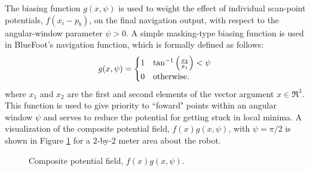 			The biasing function $g(x,\psi)$ is used to weight the effect of individual scan-point potentials, $f(x_{i}-p_{b})$, on the final navigation output, with respect to the angular-window parameter $\psi>0$. A simple masking-type biasing function is used in BlueFoot's navigation function, which is formally defined as follows:
				\begin{equation}
					g(x,\psi) = 
					\begin{cases}
					1	& \tan^{-1}\left( \frac{x_{2}}{x_{1}} \right) < \psi \\
					0 	& \text{otherwise}.
					\end{cases}
				\end{equation}
			where $x_{1}$ and $x_{2}$ are the first and second elements of the vector argument $x\in\Re^{3}$. This function is used to give priority to ``foward" points within an angular window $\psi$ and serves to reduce the potential for getting stuck in local minima. A visualization of  the composite potential field, $f(x)g(x,\psi)$, with $\psi=\pi/2$ is shown in Figure \ref{fig::potential_field} for a $2$-by-$2$ meter area about the robot.
				\begin{figure}[t!]
					\centering
					\caption{Composite potential field, $f(x)g(x,\psi)$.}
					\label{fig::potential_field}
				\end{figure}

